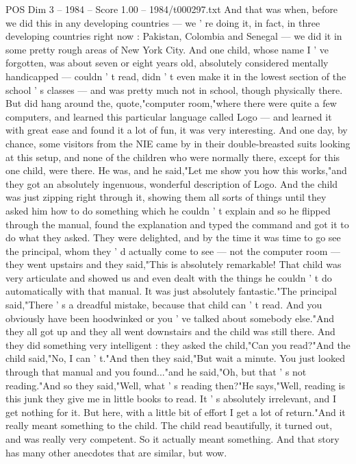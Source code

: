 \begin{textsample}{POS Dim 3 – 1984 – Score 1.00 – 1984/t000297.txt}
And that was when, before we did this in any developing countries — we ' re doing it, in fact, in three developing countries right now : Pakistan, Colombia and Senegal — we did it in some pretty rough areas of New York City.
And one child, whose name I ' ve forgotten, was about seven or eight years old, absolutely considered mentally handicapped — couldn ' t read, didn ' t even make it in the lowest section of the school ' s classes — and was pretty much not in school, though physically there.
But did hang around the, quote,"computer room,"where there were quite a few computers, and learned this particular language called Logo — and learned it with great ease and found it a lot of fun, it was very interesting.
And one day, by chance, some visitors from the NIE came by in their double-breasted suits looking at this setup, and none of the children who were normally there, except for this one child, were there.
He was, and he said,"Let me show you how this works,"and they got an absolutely ingenuous, wonderful description of Logo.
And the child was just zipping right through it, showing them all sorts of things until they asked him how to do something which he couldn ' t explain and so he flipped through the manual, found the explanation and typed the command and got it to do what they asked.
They were delighted, and by the time it was time to go see the principal, whom they ' d actually come to see — not the computer room — they went upstairs and they said,"This is absolutely remarkable!
That child was very articulate and showed us and even dealt with the things he couldn ' t do automatically with that manual.
It was just absolutely fantastic."The principal said,"There ' s a dreadful mistake, because that child can ' t read.
And you obviously have been hoodwinked or you ' ve talked about somebody else."And they all got up and they all went downstairs and the child was still there.
And they did something very intelligent : they asked the child,"Can you read?"And the child said,"No, I can ' t."And then they said,"But wait a minute.
You just looked through that manual and you found..."and he said,"Oh, but that ' s not reading."And so they said,"Well, what ' s reading then?"He says,"Well, reading is this junk they give me in little books to read.
It ' s absolutely irrelevant, and I get nothing for it.
But here, with a little bit of effort I get a lot of return."And it really meant something to the child.
The child read beautifully, it turned out, and was really very competent.
So it actually meant something.
And that story has many other anecdotes that are similar, but wow.

\end{textsample}
